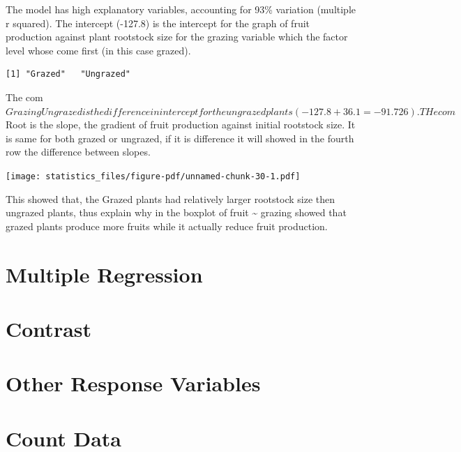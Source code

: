 \documentclass[
  letterpaper,
  DIV=11,
  numbers=noendperiod]{scrreprt}
\begin{document}
The model has high explanatory variables, accounting for 93\% variation
(multiple r squared). The intercept (-127.8) is the intercept for the
graph of fruit production against plant rootstock size for the grazing
variable which the factor level whose come first (in this case grazed).

\begin{verbatim}
[1] "Grazed"   "Ungrazed"
\end{verbatim}

The
com\(GrazingUngrazed is the difference in intercept for the ungrazed plants (-127.8 + 36.1 = -91.726).
THe com\)Root is the slope, the gradient of fruit production against
initial rootstock size. It is same for both grazed or ungrazed, if it is
difference it will showed in the fourth row the difference between
slopes.

\texttt{[image: statistics\_files/figure-pdf/unnamed-chunk-30-1.pdf]}

This showed that, the Grazed plants had relatively larger rootstock size
then ungrazed plants, thus explain why in the boxplot of fruit
\textasciitilde{} grazing showed that grazed plants produce more fruits
while it actually reduce fruit production.

\section*{Multiple Regression}\label{multiple-regression}


\section*{Contrast}\label{contrast}


\section*{Other Response Variables}\label{other-response-variables}


\section*{Count Data}\label{count-data}
\end{document}

